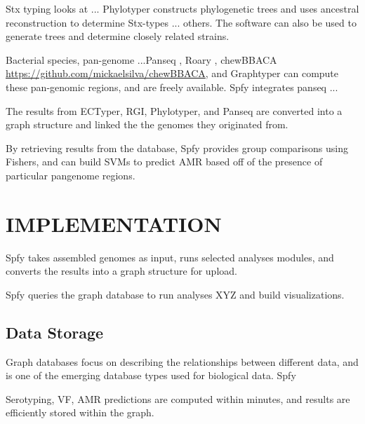 \documentclass[a4,center,fleqn]{NAR}
\begin{document}
Stx typing looks at ...
Phylotyper constructs phylogenetic trees and uses ancestral reconstruction to determine Stx-types ... others.
The software can also be used to generate trees and determine closely related strains.

Bacterial species, pan-genome ...Panseq \cite{laing2010pan}, Roary \cite{page2015roary}, chewBBACA \url{https://github.com/mickaelsilva/chewBBACA}, and Graphtyper \cite{Eggertsson148403} can compute these pan-genomic regions, and are freely available.
Spfy integrates panseq ...

The results from ECTyper, RGI, Phylotyper, and Panseq are converted into a graph structure and linked the the genomes they originated from.

By retrieving results from the database, Spfy provides group comparisons using Fishers, and can build SVMs to predict AMR based off of the presence of particular pangenome regions.

\section{IMPLEMENTATION}

Spfy takes assembled genomes as input, runs selected analyses modules, and converts the results into a graph structure for upload.

Spfy queries the graph database to run analyses XYZ and build visualizations.

\subsection{Data Storage}

Graph databases focus on describing the relationships between different data, and is one of the emerging \cite{de2015trends} database types used for biological data.
Spfy 

Serotyping, VF, AMR predictions are computed within minutes, and results are efficiently stored within the graph.
\end{document}
